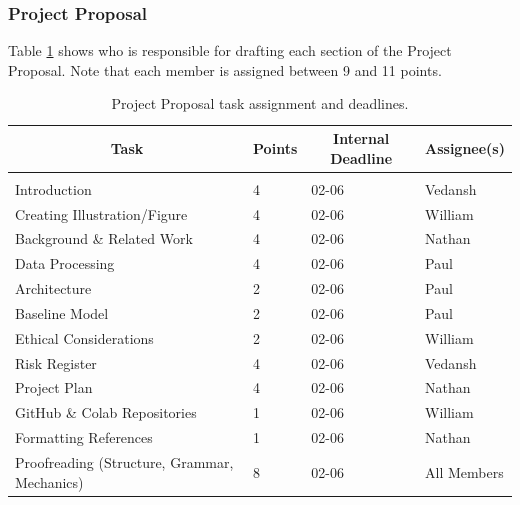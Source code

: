 \documentclass{article} %
\begin{document}
\subsubsection{Project Proposal}

Table \ref{project_proposal_table} shows who is responsible for drafting each section of the Project Proposal. Note that each member is assigned between 9 and 11 points.

    \begin{table}[t]
    \caption{Project Proposal task assignment and deadlines.}
    \label{project_proposal_table}
    \begin{center}
    \begin{tabular}{llll}
    \multicolumn{1}{c}{\bf Task}                    & \multicolumn{1}{c}{\bf Points} & \multicolumn{1}{c}{\bf Internal Deadline} & \multicolumn{1}{c}{\bf Assignee(s)}
    \\ \hline \\
    Introduction                                    & 4                              & 02-06                                     & Vedansh \\
    Creating Illustration/Figure                    & 4                              & 02-06                                     & William \\
    Background \& Related Work                      & 4                              & 02-06                                     & Nathan \\
    Data Processing                                 & 4                              & 02-06                                     & Paul \\
    Architecture                                    & 2                              & 02-06                                     & Paul \\
    Baseline Model                                  & 2                              & 02-06                                     & Paul \\
    Ethical Considerations                          & 2                              & 02-06                                     & William \\
    Risk Register                                   & 4                              & 02-06                                     & Vedansh \\
    Project Plan                                    & 4                              & 02-06                                     & Nathan \\
    GitHub \& Colab Repositories                    & 1                              & 02-06                                     & William \\
    Formatting References                           & 1                              & 02-06                                     & Nathan \\
    Proofreading (Structure, Grammar, Mechanics)    & 8                              & 02-06                                     & All Members \\
    \end{tabular}
    \end{center}
    \end{table}
\end{document}

